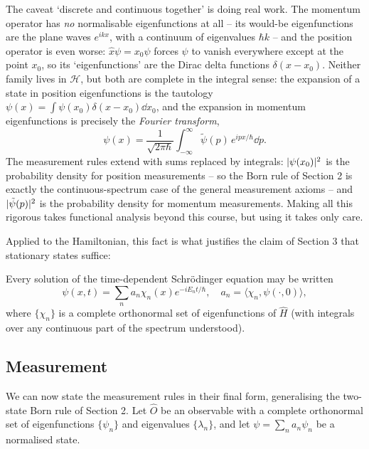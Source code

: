 \documentclass[a4paper]{scrartcl}
\newcommand{\inp}[2]{\langle #1, #2 \rangle}
\begin{document}
\begin{remark}
    The caveat `discrete and continuous together' is doing real work. The momentum operator has \emph{no} normalisable eigenfunctions at all -- its would-be eigenfunctions are the plane waves $e^{ikx}$, with a continuum of eigenvalues $\hbar k$ -- and the position operator is even worse: $\hat{x}\psi = x_0 \psi$ forces $\psi$ to vanish everywhere except at the point $x_0$, so its `eigenfunctions' are the Dirac delta functions $\delta(x - x_0)$. Neither family lives in $\mathcal{H}$, but both are complete in the integral sense: the expansion of a state in position eigenfunctions is the tautology $\psi(x) = \int \psi(x_0) \delta(x - x_0) \dd x_0$, and the expansion in momentum eigenfunctions is precisely the \emph{Fourier transform},
    $$
    \psi(x) = \frac{1}{\sqrt{2\pi\hbar}} \int_{-\infty}^{\infty} \tilde{\psi}(p) \, e^{ipx/\hbar} \dd p.
    $$
    The measurement rules extend with sums replaced by integrals: $\lvert\psi(x_0)\rvert^2$ is the probability density for position measurements -- so the Born rule of Section 2 is exactly the continuous-spectrum case of the general measurement axioms -- and $\lvert\tilde\psi(p)\rvert^2$ is the probability density for momentum measurements. Making all this rigorous takes functional analysis beyond this course, but using it takes only care.
\end{remark} Applied to the Hamiltonian, this fact is what justifies the claim of Section 3 that stationary states suffice:

\begin{corollary}
    Every solution of the time-dependent Schr\"odinger equation may be written
    $$
    \psi(x, t) = \sum_n a_n \chi_n(x) e^{-i E_n t/\hbar}, \quad a_n = \inp{\chi_n}{\psi(\cdot, 0)},
    $$
    where $\{\chi_n\}$ is a complete orthonormal set of eigenfunctions of $\hat{H}$ (with integrals over any continuous part of the spectrum understood).
\end{corollary}

\subsection{Measurement}

We can now state the measurement rules in their final form, generalising the two-state Born rule of Section 2. Let $\hat{O}$ be an observable with a complete orthonormal set of eigenfunctions $\{\psi_n\}$ and eigenvalues $\{\lambda_n\}$, and let $\psi = \sum_n a_n \psi_n$ be a normalised state.
\end{document}
